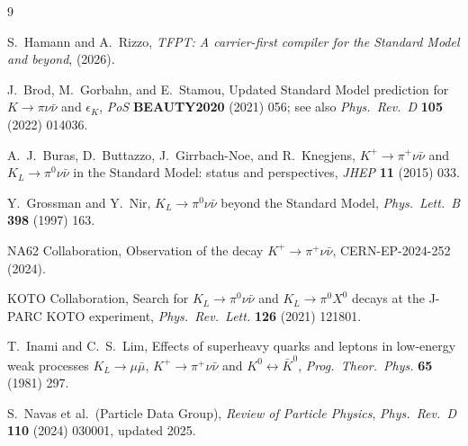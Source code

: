 \documentclass[11pt,a4paper]{article}
\theoremstyle{definition}
\theoremstyle{remark}
\numberwithin{equation}{section}
\begin{document}
\begin{thebibliography}{9}

S.~Hamann and A.~Rizzo,
\textit{TFPT: A carrier-first compiler for the Standard Model and beyond},
(2026).

J.~Brod, M.~Gorbahn, and E.~Stamou,
Updated Standard Model prediction for $K\to\pi\nu\bar\nu$ and
$\epsilon_K$,
\textit{PoS} \textbf{BEAUTY2020} (2021) 056;
see also \textit{Phys.\ Rev.\ D} \textbf{105} (2022) 014036.

A.~J.~Buras, D.~Buttazzo, J.~Girrbach-Noe, and R.~Knegjens,
$K^+\to\pi^+\nu\bar\nu$ and $K_L\to\pi^0\nu\bar\nu$ in the Standard
Model: status and perspectives,
\textit{JHEP} \textbf{11} (2015) 033.

Y.~Grossman and Y.~Nir,
$K_L\to\pi^0\nu\bar\nu$ beyond the Standard Model,
\textit{Phys.\ Lett.\ B} \textbf{398} (1997) 163.

NA62 Collaboration,
Observation of the decay $K^+\to\pi^+\nu\bar\nu$,
CERN-EP-2024-252 (2024).

KOTO Collaboration,
Search for $K_L\to\pi^0\nu\bar\nu$ and
$K_L\to\pi^0 X^0$ decays at the J-PARC KOTO experiment,
\textit{Phys.\ Rev.\ Lett.} \textbf{126} (2021) 121801.

T.~Inami and C.~S.~Lim,
Effects of superheavy quarks and leptons in low-energy weak processes
$K_L\to\mu\bar\mu$, $K^+\to\pi^+\nu\bar\nu$ and $K^0\leftrightarrow\bar K^0$,
\textit{Prog.\ Theor.\ Phys.} \textbf{65} (1981) 297.

S.~Navas et al.\ (Particle Data Group),
\textit{Review of Particle Physics},
\textit{Phys.\ Rev.\ D} \textbf{110} (2024) 030001, updated 2025.

\end{thebibliography}
\end{document}
